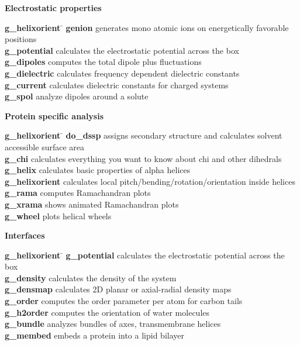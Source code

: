 \begin{description}
\item {\large\bf Electrostatic properties}
\vspace{-2ex}\begin{tabbing}
{\bf g\_helixorient} \= \kill
{\bf genion} \> generates mono atomic ions on energetically favorable positions \\
{\bf g\_potential} \> calculates the electrostatic potential across the box \\
{\bf g\_dipoles} \> computes the total dipole plus fluctuations \\
{\bf g\_dielectric} \> calculates frequency dependent dielectric constants \\
{\bf g\_current} \> calculates dielectric constants for charged systems \\
{\bf g\_spol} \> analyze dipoles around a solute \\
\end{tabbing}\vspace{-2ex}

\item {\large\bf Protein specific analysis}
\vspace{-2ex}\begin{tabbing}
{\bf g\_helixorient} \= \kill
{\bf do\_dssp} \> assigns secondary structure and calculates solvent accessible surface area \\
{\bf g\_chi} \> calculates everything you want to know about chi and other dihedrals \\
{\bf g\_helix} \> calculates basic properties of alpha helices \\
{\bf g\_helixorient} \> calculates local pitch/bending/rotation/orientation inside helices \\
{\bf g\_rama} \> computes Ramachandran plots \\
{\bf g\_xrama} \> shows animated Ramachandran plots \\
{\bf g\_wheel} \> plots helical wheels \\
\end{tabbing}\vspace{-2ex}

\item {\large\bf Interfaces}
\vspace{-2ex}\begin{tabbing}
{\bf g\_helixorient} \= \kill
{\bf g\_potential} \> calculates the electrostatic potential across the box \\
{\bf g\_density} \> calculates the density of the system \\
{\bf g\_densmap} \> calculates 2D planar or axial-radial density maps \\
{\bf g\_order} \> computes the order parameter per atom for carbon tails \\
{\bf g\_h2order} \> computes the orientation of water molecules \\
{\bf g\_bundle} \> analyzes bundles of axes, {\eg} transmembrane helices \\
{\bf g\_membed} \> embeds a protein into a lipid bilayer \\
\end{tabbing}\vspace{-2ex}


\end{description}

